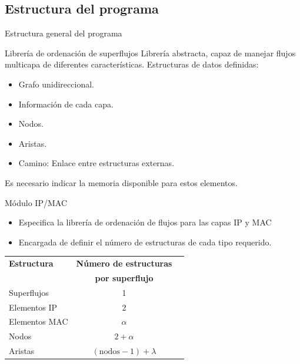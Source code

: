 \documentclass{beamer}
\begin{document}
\subsection{Estructura del programa}
\begin{frame}{Estructura general del programa}
    \begin{figure}
    \scalebox{.55}{}
    \end{figure}
\end{frame}

\begin{frame}{Librería de ordenación de superflujos}
Librería abstracta, capaz de manejar flujos multicapa de diferentes características.
Estructuras de datos definidas:
\begin{itemize}
    \item Grafo unidireccional.
    \item Información de cada capa.
    \item Nodos.
    \item Aristas.
    \item Camino: Enlace entre estructuras externas.
\end{itemize}

Es necesario indicar la memoria disponible para estos elementos.
\end{frame}

\begin{frame}{Módulo IP/MAC}
\begin{itemize}
    \item Especifica la librería de ordenación de flujos para las capas IP y MAC
    \item Encargada de definir el número de estructuras de cada tipo requerido.
\end{itemize}

\begin{table}
	\begin{tabular}{lcc}
		\toprule \textbf{Estructura} & \textbf{Número de estructuras} \\ 
		& \textbf{por superflujo}\\
		\midrule
		Superflujos & 1 \\
		Elementos IP & 2 \\
		Elementos MAC & $\alpha$ \\
		Nodos & $2 + \alpha$ \\
		Aristas & $(\mbox{nodos} - 1) + \lambda$  \\ \bottomrule
	\end{tabular}
\end{table}
    
\end{frame}
\end{document}
